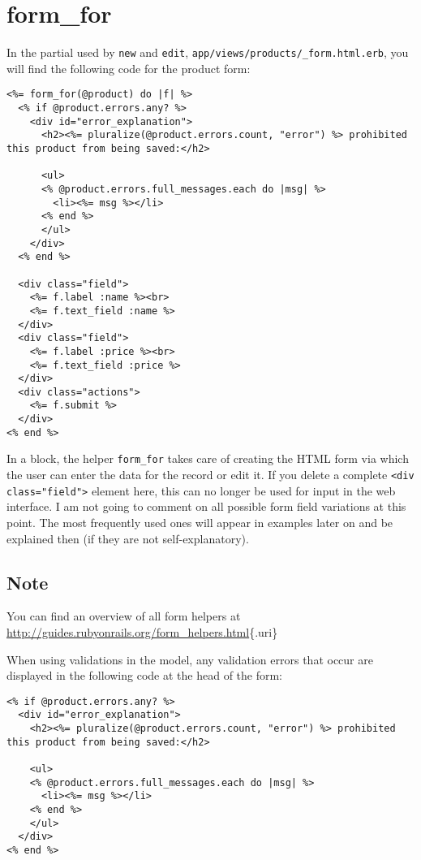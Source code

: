 \documentclass[a4paper]{book}
\begin{document}
\section{form\_for}\label{formux5ffor}

In the partial used by \texttt{new} and \texttt{edit}, \texttt{app/views/products/\_form.html.erb}, you will find the following code for the product form:

\begin{shaded}\begin{verbatim}
<%= form_for(@product) do |f| %>
  <% if @product.errors.any? %>
    <div id="error_explanation">
      <h2><%= pluralize(@product.errors.count, "error") %> prohibited this product from being saved:</h2>

      <ul>
      <% @product.errors.full_messages.each do |msg| %>
        <li><%= msg %></li>
      <% end %>
      </ul>
    </div>
  <% end %>

  <div class="field">
    <%= f.label :name %><br>
    <%= f.text_field :name %>
  </div>
  <div class="field">
    <%= f.label :price %><br>
    <%= f.text_field :price %>
  </div>
  <div class="actions">
    <%= f.submit %>
  </div>
<% end %>
\end{verbatim}\end{shaded}

In a block, the helper \texttt{form\_for} takes care of creating the HTML form via which the user can enter the data for the record or edit it. If you delete a complete \texttt{\textless{}div         class="field"\textgreater{}} element here, this can no longer be used for input in the web interface. I am not going to comment on all possible form field variations at this point. The most frequently used ones will appear in examples later on and be explained then (if they are not self-explanatory).

\subsection{Note}\label{note-34}

You can find an overview of all form helpers at \url{http://guides.rubyonrails.org/form_helpers.html}\{.uri\}

When using validations in the model, any validation errors that occur are displayed in the following code at the head of the form:

\begin{shaded}\begin{verbatim}
<% if @product.errors.any? %>
  <div id="error_explanation">
    <h2><%= pluralize(@product.errors.count, "error") %> prohibited this product from being saved:</h2>

    <ul>
    <% @product.errors.full_messages.each do |msg| %>
      <li><%= msg %></li>
    <% end %>
    </ul>
  </div>
<% end %>
\end{verbatim}\end{shaded}
\end{document}
